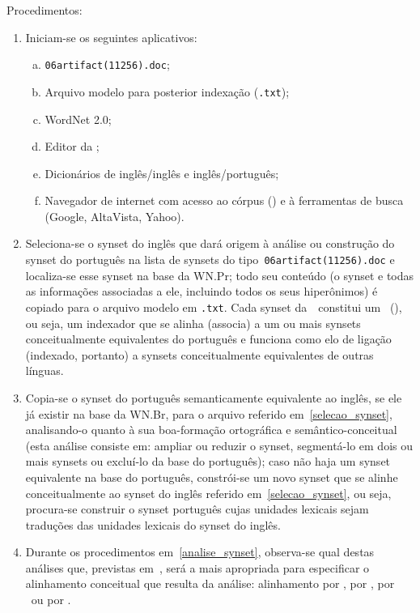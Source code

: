 Procedimentos:
	
\begin{enumerate}
  \item Iniciam-se os seguintes aplicativos:

    \begin{enumerate}[a.]
      \item \texttt{06artifact(11256).doc};
      \item Arquivo modelo para posterior indexação (\texttt{.txt});
      \item WordNet 2.0;
      \item Editor da \wnbr;
      \item Dicionários de inglês/inglês e inglês/português;
      \item Navegador de internet com acesso ao córpus (\nilc) e à
        ferramentas de busca (Google, AltaVista, Yahoo).
    \end{enumerate}

  \item\label{selecao_synset} Seleciona-se o synset do inglês que dará origem à
    análise ou construção do synset do português na lista de synsets do
    tipo~\texttt{06artifact(11256).doc} e localiza-se esse synset na base da
    WN.Pr; todo seu conteúdo (o synset e todas as informações associadas a ele,
    incluindo todos os seus hiperônimos) é copiado para o arquivo modelo em
    \texttt{.txt}. Cada synset da~\wnpr\ constitui um \ili\
    (), ou seja, um indexador que se alinha (associa) a
    um ou mais synsets conceitualmente equivalentes do português e funciona
    como elo de ligação (indexado, portanto) a synsets conceitualmente
    equivalentes de outras línguas.

  \item\label{analise_synset} Copia-se o synset do português semanticamente
    equivalente ao inglês, se ele já existir na base da WN.Br, para o arquivo
    referido em~\ref{selecao_synset}, analisando-o quanto à sua boa-formação
    ortográfica e semântico-conceitual (esta análise consiste em:  ampliar ou
    reduzir o synset, segmentá-lo em dois ou mais synsets ou excluí-lo da base
    do português); caso não haja um synset equivalente na base do português,
    constrói-se um novo synset que se alinhe conceitualmente ao synset do
    inglês referido em~\ref{selecao_synset}, ou seja, procura-se construir o
    synset português cujas unidades lexicais sejam traduções das unidades
    lexicais do synset do inglês.

  \item Durante os procedimentos em~\ref{analise_synset}, observa-se qual
    destas análises que, previstas em~\citeonline{vossenetal}, será a mais
    apropriada para especificar o alinhamento conceitual que resulta da
    análise: alinhamento por \eqsyn, por \eqnsyn, por \eqhypo\ ou por \eqhyper.


\end{enumerate}
